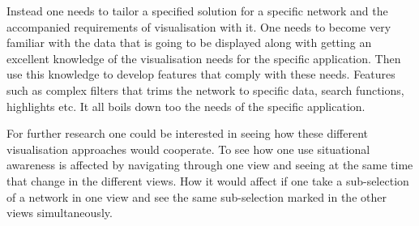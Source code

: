 \documentclass[a4paper,11pt]{kth-mag}
\begin{document}
Instead one needs to tailor a specified solution for a specific network and the accompanied requirements of visualisation with it. One needs to 
become very familiar with the data that is going to be displayed along with getting an excellent knowledge of the visualisation needs for the specific
 application. Then use this knowledge to develop features that comply with these needs. Features such as complex filters that
 trims the network to specific data, search functions, highlights etc. It all boils down too the needs of the 
 specific application.
 
 For further research one could be interested in seeing how these different visualisation approaches would 
 cooperate. To see how one use situational awareness is affected by navigating through one view and seeing
 at the same time that change in the different views. How it would affect if one take a sub-selection of 
 a network in one view and see the same sub-selection marked in the other views simultaneously.
\end{document}
